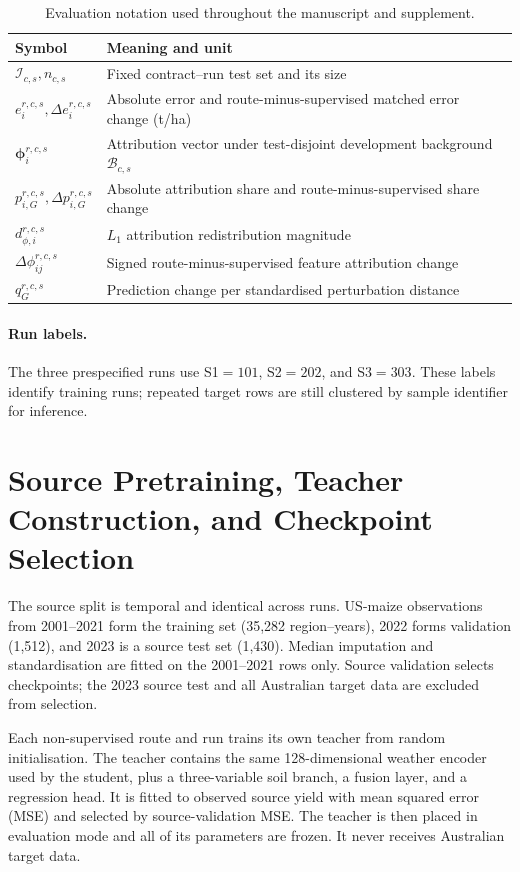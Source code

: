 \documentclass[runningheads]{venue/lncs/llncs}
\begin{document}
\begin{table}[h]
\centering
\caption{Evaluation notation used throughout the manuscript and supplement.}
\small
\setlength{\tabcolsep}{3pt}
\begin{tabular}{p{}p{}}
\toprule
Symbol & Meaning and unit\\
\midrule
$\mathcal I_{c,s}, n_{c,s}$ & Fixed contract--run test set and its size\\
$e_i^{r,c,s},\Delta e_i^{r,c,s}$ & Absolute error and route-minus-supervised matched error change (t/ha)\\
$\boldsymbol\phi_i^{r,c,s}$ & Attribution vector under test-disjoint development background $\mathcal B_{c,s}$\\
$p_{i,G}^{r,c,s},\Delta p_{i,G}^{r,c,s}$ & Absolute attribution share and route-minus-supervised share change\\
$d_{\phi,i}^{r,c,s}$ & $L_1$ attribution redistribution magnitude\\
$\Delta\phi_{ij}^{r,c,s}$ & Signed route-minus-supervised feature attribution change\\
$q_G^{r,c,s}$ & Prediction change per standardised perturbation distance\\
\bottomrule
\end{tabular}
\end{table}

\paragraph{Run labels.} The three prespecified runs use S1$=101$, S2$=202$, and S3$=303$. These labels identify training runs; repeated target rows are still clustered by sample identifier for inference.

\section{Source Pretraining, Teacher Construction, and Checkpoint Selection}

The source split is temporal and identical across runs. US-maize observations from 2001--2021 form the training set (35,282 region--years), 2022 forms validation (1,512), and 2023 is a source test set (1,430). Median imputation and standardisation are fitted on the 2001--2021 rows only. Source validation selects checkpoints; the 2023 source test and all Australian target data are excluded from selection.

Each non-supervised route and run trains its own teacher from random initialisation. The teacher contains the same 128-dimensional weather encoder used by the student, plus a three-variable soil branch, a fusion layer, and a regression head. It is fitted to observed source yield with mean squared error (MSE) and selected by source-validation MSE. The teacher is then placed in evaluation mode and all of its parameters are frozen. It never receives Australian target data.
\end{document}
